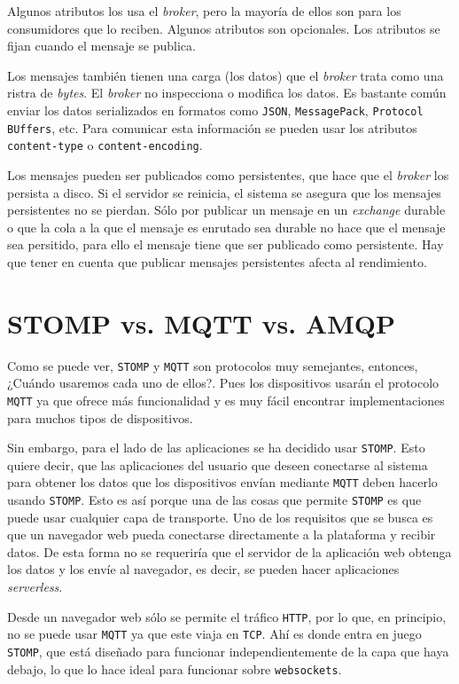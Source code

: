 Algunos atributos los usa el \emph{broker}, pero la mayoría de ellos son para
los consumidores que lo reciben. Algunos atributos
son opcionales. Los atributos se fijan cuando el mensaje se publica.

Los mensajes también tienen una carga (los datos) que el \emph{broker} trata
como una ristra de \emph{bytes}. El \emph{broker} no inspecciona o modifica
los datos. Es bastante común enviar los datos serializados en formatos como
\texttt{JSON}, \texttt{MessagePack}, \texttt{Protocol BUffers}, etc. Para comunicar
esta información se pueden usar los atributos \texttt{content-type} o \texttt{content-encoding}.

Los mensajes pueden ser publicados como persistentes, que hace que el \emph{broker}
los persista a disco. Si el servidor se reinicia, el sistema se asegura que los
mensajes persistentes no se pierdan. Sólo por publicar un mensaje en un \emph{exchange}
durable o que la cola a la que el mensaje es enrutado sea durable no hace que el
mensaje sea persitido, para ello el mensaje tiene que ser publicado como persistente.
Hay que tener en cuenta que publicar mensajes persistentes afecta al rendimiento.


\section{STOMP vs. MQTT vs. AMQP}

Como se puede ver, \texttt{STOMP} y \texttt{MQTT} son protocolos muy semejantes,
entonces, ¿Cuándo usaremos cada uno de ellos?. Pues los dispositivos usarán el
protocolo \texttt{MQTT} ya que ofrece más funcionalidad y es muy fácil encontrar
implementaciones para muchos tipos de dispositivos.

Sin embargo, para el lado de las aplicaciones se ha decidido usar \texttt{STOMP}.
Esto quiere decir, que las aplicaciones del usuario que deseen conectarse al
sistema para obtener los datos que los dispositivos envían mediante \texttt{MQTT}
deben hacerlo usando \texttt{STOMP}. Esto es así porque una de las cosas que
permite \texttt{STOMP} es que puede usar cualquier capa de transporte. Uno de los
requisitos que se busca es que un navegador web pueda conectarse
directamente a la plataforma y recibir datos. De esta forma no se requeriría que
el servidor de la aplicación web obtenga los datos y los envíe al navegador, es decir,
se pueden hacer aplicaciones \emph{serverless}.

Desde un navegador web sólo se permite el tráfico \texttt{HTTP}, por lo que, en
principio, no se puede usar \texttt{MQTT} ya que este viaja en \texttt{TCP}. Ahí
es donde entra en juego \texttt{STOMP}, que está diseñado para funcionar independientemente
de la capa que haya debajo, lo que lo hace ideal para funcionar sobre \texttt{websockets}.

